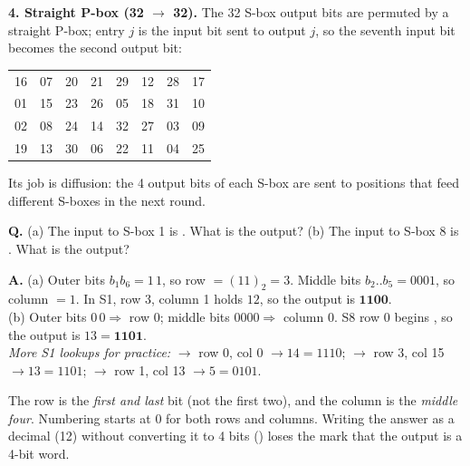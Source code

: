 \textbf{4. Straight P-box (32 $\to$ 32).} The 32 S-box output bits are permuted by a straight P-box; entry $j$ is the input bit sent to output $j$, so the seventh input bit becomes the second output bit:
\begin{center}\scriptsize\setlength{\tabcolsep}{3.2pt}
\begin{tabular}{@{}*{8}{c}@{}}
16&07&20&21&29&12&28&17\\ 01&15&23&26&05&18&31&10\\ 02&08&24&14&32&27&03&09\\ 19&13&30&06&22&11&04&25\\
\end{tabular}
\end{center}
Its job is diffusion: the 4 output bits of each S-box are sent to positions that feed different S-boxes in the next round.

\begin{worked}
\textbf{Q.} (a) The input to S-box 1 is . What is the output? (b) The input to S-box 8 is . What is the output?

\textbf{A.} (a) Outer bits $b_1 b_6 = 1\,1$, so row $= (11)_2 = 3$. Middle bits $b_2..b_5 = 0001$, so column $= 1$. In S1, row 3, column 1 holds $12$, so the output is $\mathbf{1100}$.\\
(b) Outer bits $0\,0 \Rightarrow$ row 0; middle bits $0000 \Rightarrow$ column 0. S8 row 0 begins , so the output is $13 = \mathbf{1101}$.\\
\emph{More S1 lookups for practice:}  $\to$ row 0, col 0 $\to 14 = 1110$;  $\to$ row 3, col 15 $\to 13 = 1101$;  $\to$ row 1, col 13 $\to 5 = 0101$.
\end{worked}

\begin{trap}
The row is the \emph{first and last} bit (not the first two), and the column is the \emph{middle four}. Numbering starts at 0 for both rows and columns. Writing the answer as a decimal (12) without converting it to 4 bits () loses the mark that the output is a 4-bit word.
\end{trap}

